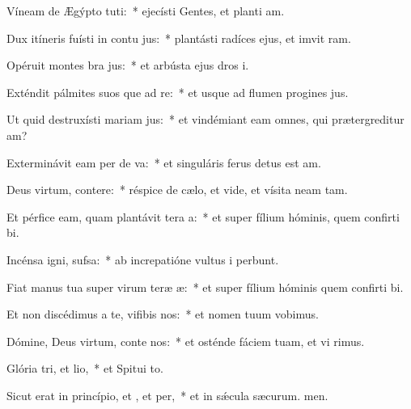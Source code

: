 \item Víneam de Ægýpto tuti:~* ejecísti Gentes, et planti am.
\item Dux itíneris fuísti in contu jus:~* plantásti radíces ejus, et imvit ram.
\item Opéruit montes bra jus:~* et arbústa ejus dros i.
\item Exténdit pálmites suos que ad re:~* et usque ad flumen progines jus.
\item Ut quid destruxísti mariam jus:~* et vindémiant eam omnes, qui prætergreditur am?
\item Exterminávit eam per de va:~* et singuláris ferus detus est am.
\item Deus virtum, contere:~* réspice de cælo, et vide, et vísita neam tam.
\item Et pérfice eam, quam plantávit tera a:~* et super fílium hóminis, quem confirti bi.
\item Incénsa igni,  sufsa:~* ab increpatióne vultus i perbunt.
\item Fiat manus tua super virum teræ æ:~* et super fílium hóminis quem confirti bi.
\item Et non discédimus a te, vifibis nos:~* et nomen tuum vobimus.
\item Dómine, Deus virtum, conte nos:~* et osténde fáciem tuam, et vi rimus.
\item Glória tri, et lio,~* et Spitui to.
\item Sicut erat in princípio, et , et per,~* et in sǽcula sæcurum. men.
